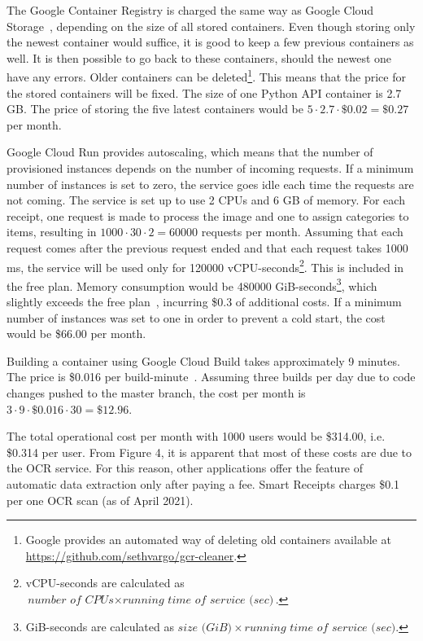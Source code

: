 \documentclass[
  digital, %
  table,   %
  oneside, %
  lof,     %
  lot,     %
]{fithesis3}
\begin{document}
The Google Container Registry is charged the same way as Google Cloud Storage~\cite{ContainerRegistryPricing}, depending on the size of all stored containers. Even though storing only the newest container would suffice, it is good to keep a few previous containers as well. It is then possible to go back to these containers, should the newest one have any errors. Older containers can be deleted\footnote{Google provides an automated way of deleting old containers available at \url{https://github.com/sethvargo/gcr-cleaner}.}. This means that the price for the stored containers will be fixed. The size of one Python API container is 2.7 GB. The price of storing the five latest containers would be $5 \cdot 2.7 \cdot \$0.02 = \$0.27$ per month. 

Google Cloud Run provides autoscaling, which means that the number of provisioned instances depends on the number of incoming requests. If a minimum number of instances is set to zero, the service goes idle each time the requests are not coming. The service is set up to use 2 CPUs and 6 GB of memory. For each receipt, one request is made to process the image and one to assign categories to items, resulting in $\num{1000} \cdot 30 \cdot 2 = \num{60000}$ requests per month. Assuming that each request comes after the previous request ended and that each request takes \num{1000} ms, the service will be used only for \num{120000} vCPU-seconds\footnote{vCPU-seconds are calculated as $\textit{number of CPUs} \times \textit{running time of service (sec)}$.}. This is included in the free plan. Memory consumption would be \num{480000} GiB-seconds\footnote{GiB-seconds are calculated as $\textit{size (GiB)} \times \textit{running time of service (sec)}.$}, which slightly exceeds the free plan~\cite{CloudRunPricing}, incurring \$0.3 of additional costs. 
If a minimum number of instances was set to one in order to prevent a cold start, the cost would be \$66.00 per month.

Building a container using Google Cloud Build takes approximately 9 minutes. The price is \$0.016 per build-minute~\cite{CloudBuildPricing}. Assuming three builds per day due to code changes pushed to the master branch, the cost per month is $3 \cdot 9 \cdot \$0.016 \cdot 30 = \$12.96$.

The total operational cost per month with \num{1000} users would be \$314.00, i.e. \$0.314 per user.
From Figure 4, it is apparent that most of these costs are due to the OCR service. For this reason, other applications offer the feature of automatic data extraction only after paying a fee. Smart Receipts charges \$0.1 per one OCR scan (as of April 2021).
\end{document}
